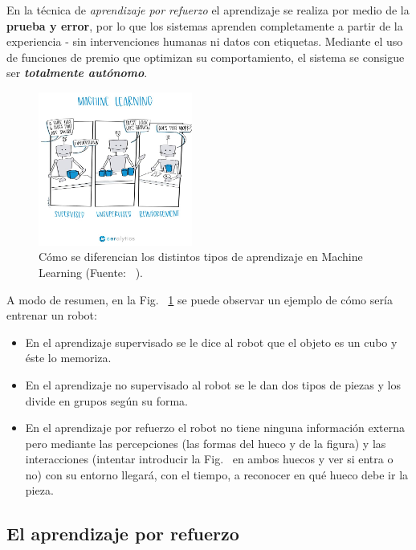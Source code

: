 En la técnica de \textit{aprendizaje por refuerzo} el aprendizaje se realiza por medio de la \textbf{\textbf{prueba y error}}, por lo que los sistemas aprenden completamente a partir de la experiencia - sin intervenciones humanas ni datos con etiquetas. Mediante el uso de funciones de premio que optimizan su comportamiento, el sistema se consigue ser \textbf{\textit{totalmente autónomo}}. \\

\begin{figure}[h]
    \centering
    \includegraphics[width=0.45\textwidth]{cap2_contextualizacion/images/machine-learning_ceralytics.jpg}
    \caption{Cómo se diferencian los distintos tipos de aprendizaje en Machine Learning (Fuente: ~\cite{ceralyticsMLtypes}).}
    \label{fig:ml_ceralytics}
\end{figure}

A modo de resumen, en la Fig. ~\ref{fig:ml_ceralytics} se puede observar un ejemplo de cómo sería entrenar un robot:

\begin{itemize}
    \item En el aprendizaje supervisado se le dice al robot que el objeto es un cubo y éste lo memoriza.
    \item En el aprendizaje no supervisado al robot se le dan dos tipos de piezas y los divide en grupos según su forma.
    \item En el aprendizaje por refuerzo el robot no tiene ninguna información externa pero mediante las percepciones (las formas del hueco y de la figura) y las interacciones (intentar introducir la Fig. ~en ambos huecos y ver si entra o no) con su entorno llegará, con el tiempo, a reconocer en qué hueco debe ir la pieza.
\end{itemize}

\subsection{El aprendizaje por refuerzo}

